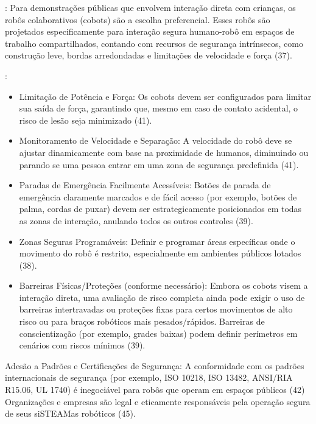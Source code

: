 \documentclass[%
  a4paper,%
  12pt,%
  fleqn,%
  english,%
  brazilian,%
]{article}
\begin{document}
	\begin{description}
		\item [Priorizar Robôs Colaborativos (Cobots)]: Para demonstrações públicas que envolvem interação direta com crianças, os robôs colaborativos (cobots) são a escolha preferencial. Esses robôs são projetados especificamente para interação segura humano-robô em espaços de trabalho compartilhados, contando com recursos de segurança intrínsecos, como construção leve, bordas arredondadas e limitações de velocidade e força (37).
		
		\item [Implementar Recursos Essenciais de Segurança]:
			\begin{itemize}
				\item Limitação de Potência e Força: Os cobots devem ser configurados para limitar sua saída de força, garantindo que, mesmo em caso de contato acidental, o risco de lesão seja minimizado (41).
				\item Monitoramento de Velocidade e Separação: A velocidade do robô deve se ajustar dinamicamente com base na proximidade de humanos, diminuindo ou parando se uma pessoa entrar em uma zona de segurança predefinida (41).
				\item Paradas de Emergência Facilmente Acessíveis: Botões de parada de emergência claramente marcados e de fácil acesso (por exemplo, botões de palma, cordas de puxar) devem ser estrategicamente posicionados em todas as zonas de interação, anulando todos os outros controles (39).
				\item Zonas Seguras Programáveis: Definir e programar áreas específicas onde o movimento do robô é restrito, especialmente em ambientes públicos lotados (38).
				\item Barreiras Físicas/Proteções (conforme necessário): Embora os cobots visem a interação direta, uma avaliação de risco completa ainda pode exigir o uso de barreiras intertravadas ou proteções fixas para certos movimentos de alto risco ou para braços robóticos mais pesados/rápidos. Barreiras de conscientização (por exemplo, grades baixas) podem definir perímetros em cenários com riscos mínimos (39).
			\end{itemize}
		\item Adesão a Padrões e Certificações de Segurança: A conformidade com os padrões internacionais de segurança (por exemplo, ISO 10218, ISO 13482, ANSI/RIA R15.06, UL 1740) é inegociável para robôs que operam em espaços públicos (42) Organizações e empresas são legal e eticamente responsáveis pela operação segura de seus siSTEAMas robóticos (45).

\end{description}
\end{document}
